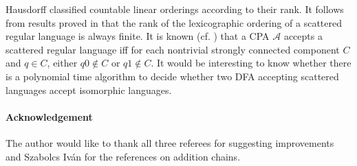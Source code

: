 \documentclass[copyright]{eptcs}
\newcommand{\cA}{\mathcal{A}}
\begin{document}
Hausdorff classified countable linear orderings according 
to their rank. It follows from results proved in
\cite{Heilbrunner} that the rank of the 
lexicographic ordering of a scattered regular language is always
finite. It is known (cf. \cite{BEscattered}) 
that a CPA $\cA$ accepts a scattered regular language
iff for each nontrivial strongly connected component $C$ 
and $q \in C$, either $q0 \not\in C$ or $q1 \not\in C$.
It would be interesting to know whether there is 
a polynomial time algorithm to decide whether two DFA 
accepting scattered languages accept isomorphic languages.


\paragraph*{Acknowledgement}
The author would like to thank all three referees for suggesting improvements
and Szabolcs Iv\'an for the references on addition chains. 
\end{document}
